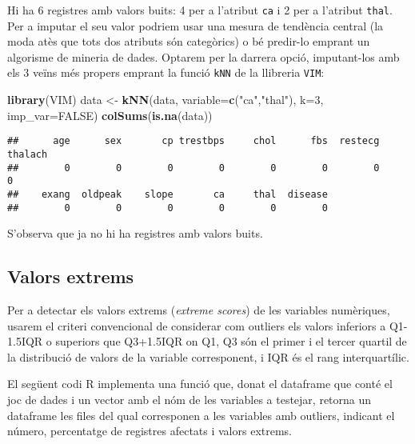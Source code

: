 \documentclass[12,]{article}
\newenvironment{Shaded}{\begin{snugshade}}{\end{snugshade}}
\newcommand{\DataTypeTok}[1]{\textcolor[rgb]{0.13,0.29,0.53}{#1}}
\newcommand{\DecValTok}[1]{\textcolor[rgb]{0.00,0.00,0.81}{#1}}
\newcommand{\KeywordTok}[1]{\textcolor[rgb]{0.13,0.29,0.53}{\textbf{#1}}}
\newcommand{\NormalTok}[1]{#1}
\newcommand{\OtherTok}[1]{\textcolor[rgb]{0.56,0.35,0.01}{#1}}
\newcommand{\StringTok}[1]{\textcolor[rgb]{0.31,0.60,0.02}{#1}}
\begin{document}
Hi ha 6 registres amb valors buits: 4 per a l'atribut \texttt{ca} i 2
per a l'atribut \texttt{thal}. Per a imputar el seu valor podriem usar
una mesura de tendència central (la moda atès que tots dos atributs són
categòrics) o bé predir-lo emprant un algorisme de mineria de dades.
Optarem per la darrera opció, imputant-los amb els 3 veïns més propers
emprant la funció \texttt{kNN} de la llibreria \texttt{VIM}:

\begin{Shaded}
\begin{Highlighting}[]
\KeywordTok{library}\NormalTok{(VIM)}
\NormalTok{data <-}\StringTok{ }\KeywordTok{kNN}\NormalTok{(data, }\DataTypeTok{variable=}\KeywordTok{c}\NormalTok{(}\StringTok{"ca"}\NormalTok{,}\StringTok{"thal"}\NormalTok{), }\DataTypeTok{k=}\DecValTok{3}\NormalTok{, }\DataTypeTok{imp_var=}\OtherTok{FALSE}\NormalTok{)}
\KeywordTok{colSums}\NormalTok{(}\KeywordTok{is.na}\NormalTok{(data))}
\end{Highlighting}
\end{Shaded}

\begin{verbatim}
##      age      sex       cp trestbps     chol      fbs  restecg  thalach 
##        0        0        0        0        0        0        0        0 
##    exang  oldpeak    slope       ca     thal  disease 
##        0        0        0        0        0        0
\end{verbatim}

S'observa que ja no hi ha registres amb valors buits.

\hypertarget{valors-extrems}{%
\subsection{Valors extrems}\label{valors-extrems}}

Per a detectar els valors extrems (\emph{extreme scores}) de les
variables numèriques, usarem el criteri convencional de considerar com
outliers els valors inferiors a Q1-1.5IQR o superiors que Q3+1.5IQR on
Q1, Q3 són el primer i el tercer quartil de la distribució de valors de
la variable corresponent, i IQR és el rang interquartílic.

El següent codi R implementa una funció que, donat el dataframe que
conté el joc de dades i un vector amb el nóm de les variables a
testejar, retorna un dataframe les files del qual corresponen a les
variables amb outliers, indicant el número, percentatge de registres
afectats i valors extrems.
\end{document}
